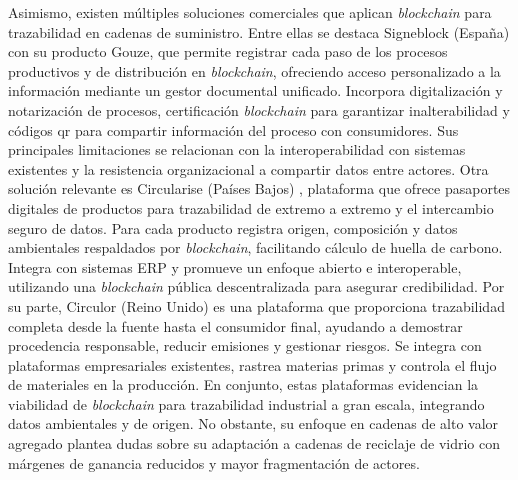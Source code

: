 Asimismo, existen múltiples soluciones comerciales que aplican \textit{blockchain} para trazabilidad en cadenas de suministro. Entre ellas se destaca Signeblock (España) \cite{signeblock2024} con su producto Gouze, que permite registrar cada paso de los procesos productivos y de distribución en \textit{blockchain}, ofreciendo acceso personalizado a la información mediante un gestor documental unificado. Incorpora digitalización y notarización de procesos, certificación \textit{blockchain} para garantizar inalterabilidad y códigos \gls{qr} para compartir información del proceso con consumidores. Sus principales limitaciones se relacionan con la interoperabilidad con sistemas existentes y la resistencia organizacional a compartir datos entre actores. Otra solución relevante es Circularise (Países Bajos) \cite{circularise2024}, plataforma que ofrece pasaportes digitales de productos para trazabilidad de extremo a extremo y el intercambio seguro de datos. Para cada producto registra origen, composición y datos ambientales respaldados por \textit{blockchain}, facilitando cálculo de huella de carbono. Integra con sistemas ERP y promueve un enfoque abierto e interoperable, utilizando una \textit{blockchain} pública descentralizada para asegurar credibilidad. Por su parte, Circulor (Reino Unido) \cite{circulor2024} es una plataforma que proporciona trazabilidad completa desde la fuente hasta el consumidor final, ayudando a demostrar procedencia responsable, reducir emisiones y gestionar riesgos. Se integra con plataformas empresariales existentes, rastrea materias primas y controla el flujo de materiales en la producción. En conjunto, estas plataformas evidencian la viabilidad de \textit{blockchain} para trazabilidad industrial a gran escala, integrando datos ambientales y de origen. No obstante, su enfoque en cadenas de alto valor agregado plantea dudas sobre su adaptación a cadenas de reciclaje de vidrio con márgenes de ganancia reducidos y mayor fragmentación de actores.

